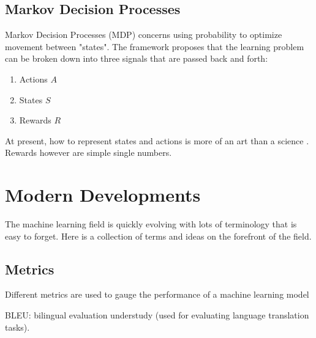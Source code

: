\subsection{Markov Decision Processes}
Markov Decision Processes (MDP) concerns using probability to optimize movement between "states". The framework proposes that the learning problem can be broken down into three signals that are passed back and forth: 
\begin{enumerate}
	\item Actions $A$
	\item States $S$
	\item Rewards $R$
\end{enumerate}
At present, how to represent states and actions is more of an art than a science \cite{sutton}. Rewards however are simple single numbers.


\section{Modern Developments}
The machine learning field is quickly evolving with lots of terminology that is easy to forget. Here is a collection of terms and ideas on the forefront of the field.


\subsection{Metrics}
Different metrics are used to gauge the performance of a machine learning model

BLEU: bilingual evaluation understudy (used for evaluating language translation tasks).

